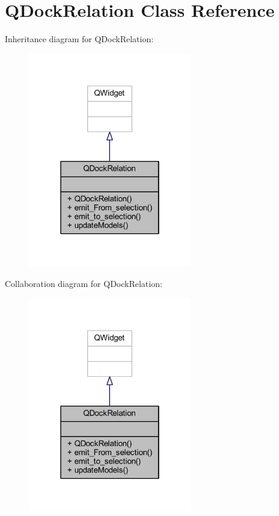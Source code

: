 \hypertarget{class_q_dock_relation}{}\section{Q\+Dock\+Relation Class Reference}
\label{class_q_dock_relation}


Inheritance diagram for Q\+Dock\+Relation\+:\nopagebreak
\begin{figure}[H]
\begin{center}
\leavevmode
\includegraphics[width=202pt]{class_q_dock_relation__inherit__graph}
\end{center}
\end{figure}


Collaboration diagram for Q\+Dock\+Relation\+:\nopagebreak
\begin{figure}[H]
\begin{center}
\leavevmode
\includegraphics[width=202pt]{class_q_dock_relation__coll__graph}
\end{center}
\end{figure}
